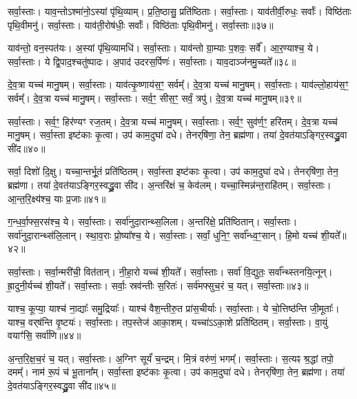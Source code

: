    सर्वा॒स्ताः।
   याव॒न्तोऽश्मा॑नो॒ऽस्यां पृ॑थि॒व्याम्।
   प्र॒ति॒ष्ठासु॒ प्रति॑ष्ठिताः।
   सर्वा॒स्ताः।
   याव॑तीर्वी॒रुधः॒ सर्वाः᳚।
   विष्ठि॑ताः पृथि॒वीमनु॑।
   सर्वा॒स्ताः।
   याव॑ती॒रोष॑धीः॒ सर्वाः᳚।
   विष्ठि॑ताः पृथि॒वीमनु॑।
   सर्वा॒स्ताः॥३७॥

   याव॑न्तो॒ वन॒स्पत॑यः।
   अ॒स्यां पृ॑थि॒व्यामधि॑।
   सर्वा॒स्ताः।
   याव॑न्तो ग्रा॒म्याः प॒शवः॒ सर्वे᳚।
   आ॒र॒ण्याश्च॒ ये।
   सर्वा॒स्ताः।
   ये द्वि॒पाद॒श्चतु॑ष्पादः।
   अ॒पाद॑ उदरस॒र्पिणः॑।
   सर्वा॒स्ताः।
   याव॒दाञ्ज॑नमु॒च्यते᳚॥३८॥

   दे॒व॒त्रा यच्च॑ मानु॒षम्।
   सर्वा॒स्ताः।
   याव॑त्कृ॒ष्णाय॑स॒ꣳ॒ सर्वम्᳚।
   दे॒व॒त्रा यच्च॑ मानु॒षम्।
   सर्वा॒स्ताः।
   याव॑ल्लो॒हाय॑स॒ꣳ॒ सर्वम्᳚।
   दे॒व॒त्रा यच्च॑ मानु॒षम्।
   सर्वा॒स्ताः।
   सर्व॒ꣳ॒ सीस॒ꣳ॒ सर्वं॒ त्रपु॑।
   दे॒व॒त्रा यच्च॑ मानु॒षम्॥३९॥

   सर्वा॒स्ताः।
   सर्व॒ꣳ॒ हिर॑ण्यꣳ रज॒तम्।
   दे॒व॒त्रा यच्च॑ मानु॒षम्।
   सर्वा॒स्ताः।
   सर्व॒ꣳ॒ सुव॑र्ण॒ꣳ॒ हरि॑तम्।
   दे॒व॒त्रा यच्च॑ मानु॒षम्।
   सर्वा॒स्ता इष्ट॑काः कृ॒त्वा।
   उप॑ काम॒दुघा॑ दधे।
   तेनर्‌षि॑णा॒ तेन॒ ब्रह्म॑णा।
   तया॑ दे॒वत॑याऽङ्गिर॒स्वद्ध्रु॒वा सी॑द॥४०॥
   \anuvakamend
  
   सर्वा॒ दिशो॑ दि॒क्षु।
   यच्चा॒न्तर्भू॒तं प्रति॑ष्ठितम्।
   सर्वा॒स्ता इष्ट॑काः कृ॒त्वा।
   उप॑ काम॒दुघा॑ दधे।
   तेनर्‌षि॑णा॒ तेन॒ ब्रह्म॑णा।
   तया॑ दे॒वत॑याऽङ्गिर॒स्वद्ध्रु॒वा सी॑द।
   अ॒न्तरि॑क्षं च॒ केव॑लम्।
   यच्चा॒स्मिन्न॑न्त॒राहि॑तम्।
   सर्वा॒स्ताः।
   आ॒न्त॒रि॒क्ष्य॑श्च॒ याः प्र॒जाः॥४१॥

   ग॒न्ध॒र्वा॒फ्स॒रस॑श्च॒ ये।
   सर्वा॒स्ताः।
   सर्वा॑नुदा॒रान्थ्स॒लिला\sn{}।
   अ॒न्तरि॑क्षे॒ प्रति॑ष्ठितान्।
   सर्वा॒स्ताः।
   सर्वा॑नुदा॒रान्थ्स॑लि॒लान्।
   स्था॒व॒राः प्रो॒ष्या᳚श्च॒ ये।
   सर्वा॒स्ताः।
   सर्वां॒ धुनि॒ꣳ॒ सर्वा᳚न्ध्व॒ꣳ॒सान्।
   हि॒मो यच्च॑ शी॒यते᳚॥४२॥

   सर्वा॒स्ताः।
   सर्वा॒न्मरी॑ची॒\an{} वित॑तान्।
   नी॒हा॒रो यच्च॑ शी॒यते᳚।
   सर्वा॒स्ताः।
   सर्वा॑ वि॒द्युतः॒ सर्वा᳚न्थ्स्तनयि॒त्नून्।
   ह्रा॒दुनी॒र्यच्च॑ शी॒यते᳚।
   सर्वा॒स्ताः।
   सर्वाः॒ स्रव॑न्तीः स॒रितः॑।
   सर्व॑मफ्सुच॒रं च॒ यत्।
   सर्वा॒स्ताः॥४३॥

   याश्च॒ कूप्या॒ याश्च॑ ना॒द्याः᳚ समु॒द्रियाः᳚।
   याश्च॑ वैश॒न्तीरु॒त प्रा॑स॒चीर्याः।
   सर्वा॒स्ताः।
   ये चो॒त्तिष्ठ॑न्ति जी॒मूताः᳚।
   याश्च॒ वर्‌ष॑न्ति वृ॒ष्टयः॑।
   सर्वा॒स्ताः।
   तप॒स्तेज॑ आका॒शम्।
   यच्चा॑ऽऽका॒शे प्रति॑ष्ठितम्।
   सर्वा॒स्ताः।
   वा॒युं वयाꣳ॑सि॒ सर्वा॑णि॥४४॥

   अ॒न्त॒रि॒क्ष॒च॒रं च॒ यत्।
   सर्वा॒स्ताः।
   अ॒ग्निꣳ सूर्यं॑ च॒न्द्रम्।
   मि॒त्रं वरु॑णं॒ भगम्᳚।
   सर्वा॒स्ताः।
   स॒त्यꣴ श्र॒द्धां तपो॒ दमम्᳚।
   नाम॑ रू॒पं च॑ भू॒ताना᳚म्।
   सर्वा॒स्ता इष्ट॑काः कृ॒त्वा।
   उप॑ काम॒दुघा॑ दधे।
   तेनर्‌षि॑णा॒ तेन॒ ब्रह्म॑णा।
   तया॑ दे॒वत॑याऽङ्गिर॒स्वद्ध्रु॒वा सी॑द॥४५॥
\anuvakamend
  
